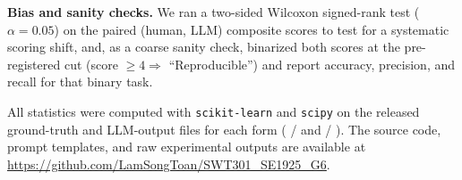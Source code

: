 \textbf{Bias and sanity checks.} We ran a two-sided Wilcoxon signed-rank test
($\alpha=0.05$) on the paired (human, LLM) composite scores to test for a
systematic scoring shift, and, as a coarse sanity check, binarized both scores
at the pre-registered cut (score $\geq 4 \Rightarrow$ ``Reproducible'') and
report accuracy, precision, and recall for that binary task.

All statistics were computed with \texttt{scikit-learn} and \texttt{scipy} on
the released ground-truth and LLM-output files for each form
( /  and
 / ).
The source code, prompt templates, and raw experimental outputs are
available at \url{https://github.com/LamSongToan/SWT301_SE1925_G6}.
